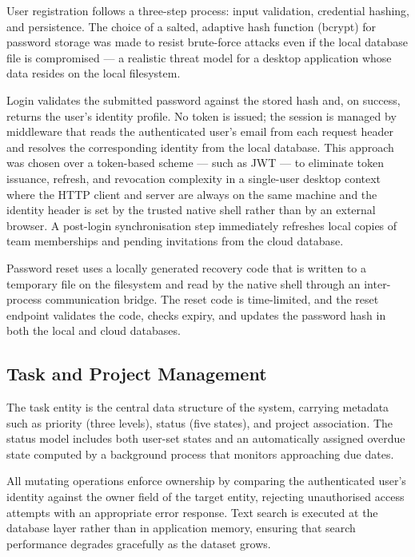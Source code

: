User registration follows a three-step process: input validation, credential
hashing, and persistence. The choice of a salted, adaptive hash function
(bcrypt) for password storage was made to resist brute-force attacks even if
the local database file is compromised --- a realistic threat model for a
desktop application whose data resides on the local filesystem.

Login validates the submitted password against the stored hash and, on success,
returns the user's identity profile. No token is issued; the session is managed
by middleware that reads the authenticated user's email from each request header
and resolves the corresponding identity from the local database. This approach
was chosen over a token-based scheme --- such as JWT --- to eliminate token
issuance, refresh, and revocation complexity in a single-user desktop context
where the HTTP client and server are always on the same machine and the
identity header is set by the trusted native shell rather than by an external
browser. A post-login synchronisation step immediately refreshes local copies of
team memberships and pending invitations from the cloud database.

Password reset uses a locally generated recovery code that is written to a
temporary file on the filesystem and read by the native shell through an
inter-process communication bridge. The reset code is time-limited,
and the reset endpoint validates the code, checks expiry, and updates the
password hash in both the local and cloud databases.

\subsection{Task and Project Management}\label{sec:meth_tasks}

The task entity is the central data structure of the system, carrying metadata
such as priority (three levels), status (five states), and project association.
The status model includes both user-set states and an automatically assigned
overdue state computed by a background process that monitors approaching due
dates.

All mutating operations enforce ownership by comparing the authenticated
user's identity against the owner field of the target entity, rejecting
unauthorised access attempts with an appropriate error response. Text search is
executed at the database layer rather than in application memory, ensuring that
search performance degrades gracefully as the dataset grows.

